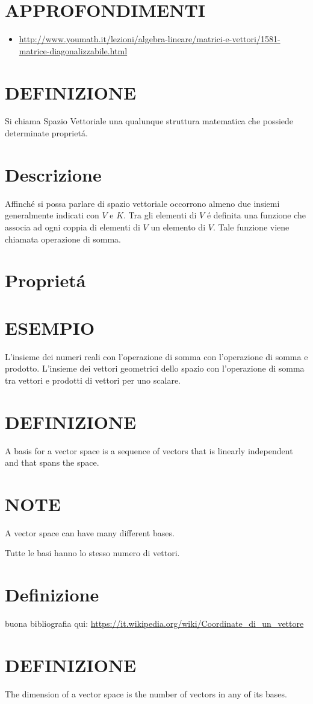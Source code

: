 \section{APPROFONDIMENTI}
\begin{itemize}
 \item \url{http://www.youmath.it/lezioni/algebra-lineare/matrici-e-vettori/1581-matrice-diagonalizzabile.html}
\end{itemize}



\section{DEFINIZIONE}
Si chiama Spazio Vettoriale una qualunque struttura matematica che possiede determinate propriet\'{a}.

\section{Descrizione}
Affinch\'{e} si possa parlare di spazio vettoriale occorrono almeno due insiemi generalmente indicati con $V$ e $K$. Tra gli elementi di $V$ \'{e} definita
una funzione che associa ad ogni coppia di elementi di $V$ un elemento di $V$. Tale funzione viene chiamata operazione di somma.
\section{Propriet\'{a}}


\section{ESEMPIO}
L'insieme dei numeri reali con l'operazione di somma con l'operazione di somma e prodotto.
L'insieme dei vettori geometrici dello spazio con l'operazione di somma tra vettori e prodotti di vettori per uno scalare.




\section{DEFINIZIONE}
A basis for a vector space is a sequence of vectors that is linearly independent and that spans the space.

\section{NOTE}
A vector space can have many different bases.

Tutte le basi hanno lo stesso numero di vettori.



\section{Definizione}
buona bibliografia qui: \url{https://it.wikipedia.org/wiki/Coordinate_di_un_vettore}




\section{DEFINIZIONE}
The dimension of a vector space is the number of vectors in any of its bases.


